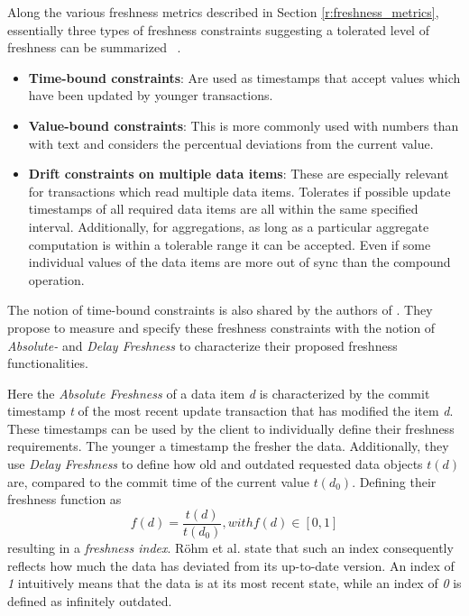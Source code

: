 Along the various freshness metrics described in Section \ref{r:freshness_metrics}, essentially three types of freshness constraints
suggesting a tolerated level of freshness can be summarized ~\cite{tamer:2005, hennemann_sw_2021}.
\begin{itemize}
    \item \textbf{Time-bound constraints}: Are used as timestamps that accept values which have been updated by younger transactions. 

    \item \textbf{Value-bound constraints}: This is  more commonly used with numbers than with text and considers the percentual deviations from the current value.

    \item \textbf{Drift constraints on multiple data items}: These are especially relevant for transactions which read multiple data items. Tolerates if possible 
    update timestamps of all required data items are all within the same specified interval. Additionally, for aggregations, as long as a particular aggregate computation 
    is within a tolerable range it can be accepted. Even if some individual values of the data items are more out of sync than the compound operation.
\end{itemize}

The notion of time-bound constraints is also shared by the authors of \cite{voicu:2010}. They propose to measure and specify these freshness constraints 
with the notion of \emph{Absolute-} and \emph{Delay Freshness} to characterize their proposed freshness functionalities.

Here the \textit{Absolute Freshness} of a data item \textit{d} is characterized by the commit timestamp \textit{t} 
of the most recent update transaction that has modified the item \textit{d}.
These timestamps can be used by the client to individually define their freshness requirements. The younger a timestamp the fresher the data.
Additionally, they use \textit{Delay Freshness} to define how old and outdated requested data objects $t(d)$ are, compared to the commit time of the current value $t(d_0)$.
Defining their freshness function as 
\begin{equation}
    f(d) = \frac{t(d)}{t(d_0)},  with f(d) \in [0,1]
\end{equation} 
resulting in a \emph{freshness index}.
Röhm et al. \cite{rohm:2002} state that such an index consequently reflects how much the data has deviated from its up-to-date version.
An index of \emph{1} intuitively means that the data is at its most recent state, while an index of \emph{0} is defined as infinitely outdated.

